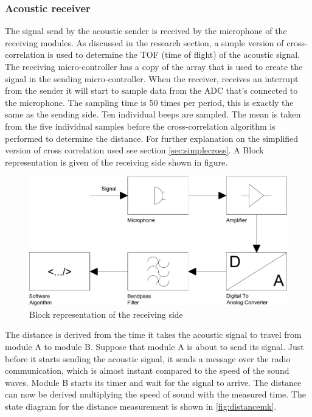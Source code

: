 \documentclass[10pt,a4paper]{article}
\begin{document}
\subsubsection{Acoustic receiver}
The signal send by the acoustic sender is received by the microphone of the receiving modules. As discussed in the research section, a simple version of cross-correlation is used to determine the TOF (time of flight) of the acoustic signal. The receiving micro-controller has a copy of the array that is used to create the signal in the sending micro-controller.
When the receiver, receives an interrupt from the sender it will start to sample data from the ADC that's connected to the microphone. The sampling time is 50 times per period, this is exactly the same as the sending side. Ten individual beeps are sampled. The mean is taken from the five individual samples before the cross-correlation algorithm is performed to determine the distance. For further explanation on the simplified version of cross correlation used see section  \ref{sec:simplecross}. A Block representation is given of the receiving side shown in figure\label{fig:demodulatorblock}.



 \begin{figure}[h]
     \centering
     \includegraphics[width=1\textwidth]{Blokschemareceive.pdf}
     \caption{Block representation of the receiving side}
     \label{fig:demodulatorblock}
 \end{figure}

The distance is derived from the time it takes the acoustic signal to travel from module A to module B. 
Suppose that module A is about to send its signal. Just before it starts sending the acoustic signal, it sends a message over the radio communication, which is almost instant compared to the speed of the sound waves. Module B starts its timer and wait for the signal to arrive. The distance can now be derived multiplying the speed of sound with the measured time. The state diagram for the distance measurement is shown in \ref{fig:distancemk}.
\end{document}
